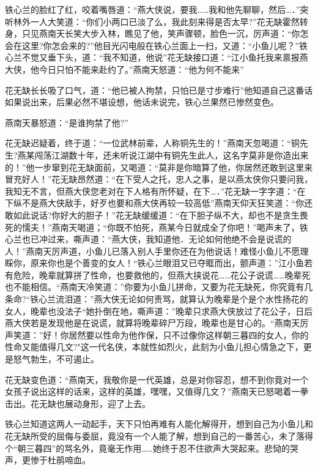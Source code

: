 \documentclass[12pt,oneside]{book}
\begin{document}
铁心兰的脸红了红，咬着嘴唇道：``燕大侠说，要我\ldots\ldots 我和他先聊聊，然后\ldots．''突听林外一人大笑道：``你们小两口已淡了么，我此刻来得是否太早?''花无缺霍然转身，只见燕南天长笑大步入林，瞧见了他，笑声骤顿，脸色一沉，厉声道：``你怎会在这里?你怎会来的?''他目光闪电般在铁心兰面上一扫，又道：``小鱼儿呢？''铁心兰不觉又垂下头，道：``我不知道，他说''花无缺接口道：``江小鱼托我来禀报燕大侠，他今日只怕不能来赴约了。''燕南天怒道：``他为何不能来''

花无缺长长吸了口气，道：``他已被人拘禁，只怕已是寸步难行''他知道自己这番话如果说出来，后果必然不堪设想，他话未说完，铁心兰果然已惨然变色。

燕南天暴怒道：``是谁拘禁了他?''

花无缺迟疑着，终于道：``一位武林前辈，人称铜先生的！''燕南天忽喝道：``铜先生?燕某闯荡江湖数十年，还未听说江湖中有铜先生此人，这名字莫非是你造出来的！''他一步窜到花无缺面前，又喝道：``莫非是你暗算了他，你居然还敢到这里来冒充好人！''花无缺昂然道：``在下受人之托，忠人之事，是以燕太侠你只要问我，我知无不言，但燕大侠您老对在下人格有所怀疑，在下\ldots．''花无缺一字字道：``在下纵不是燕大侠敌手，好歹也要和燕大侠再较一较高低''燕南天仰天狂笑道：``你还敢如此说话?你好大的胆子！''花无缺缓缓道：``在下胆子纵不大，却也不是贪生畏死的懦夫！''燕南天喝道；``你既不怕死，燕某今日就成全了你吧！''喝声未了，铁心兰也已冲过来，嘶声道：``燕大侠，我知道他．无论如何他绝不会是说谎的人！''燕南天厉声道，小鱼儿已落入别人手里你还在为他说话！难怪小鱼儿不愿理睬你，原来你也是个善变的女人！``铁心兰眼泪又已夺眶而出，颤声道：''江小鱼若有危险，晚辈就算拼了性命，也要救他的，但燕大挟说花\ldots\ldots 花公子说谎\ldots\ldots 晚辈死也不能相信。``燕南天冷笑道：''你要为小鱼儿拼命，又要为花无缺死，你究竟有几条命?``铁心兰流泪道：''燕大侠无论如何责骂，就算认为晚辈是个是个水性扬花的女人，晚辈也没法子``她扑倒在地，嘶声道：''晚辈只求燕大侠放过了花公子，日后燕大侠若是发现他是在说谎，就算将晚辈碎尸万段，晚辈也是甘心的。``燕南天厉声笑道：''好！你居然要以性命为他作保，只不过像你这样朝三暮四的女人，你的性命又能值得几文?"这一代名侠，本就性如烈火，此刻为小鱼儿担心情急之下，更是怒气勃生，不可遏止。

花无缺变色道：``燕南天，我敬你是一代英雄，总是对你容忍，想不到你竟对一个女孩子说出这样的话来，这样的英雄，嘿嘿，又值得几文？''燕南天已怒喝着一拳击出。花无缺也展动身形，迎了上去。

铁心兰知道这两人一动起手，天下只怕再难有人能化解得开，想到自己为小鱼儿和花无缺所受的屈侮与委屈，竟没有一个人能了解，想到自己的一番苦心，未了落得个``朝三暮四''的骂名外，竟毫无作用\ldots\ldots 她终于忍不住欲声大哭起来。悲恸的哭声，更惨于杜鹃啼血。
\end{document}
